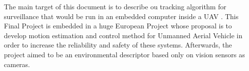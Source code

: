 

The main target of this document is to describe ou tracking algorithm for surveillance that would be run in an embedded computer inside a UAV \cite{Image_processing_UAV}.  This Final Project is embedded in a huge European Project whose proposal is to develop motion estimation and control method for Unmanned Aerial Vehicle in order to increase the reliability and safety of these systems. Afterwards, the project aimed to be an environmental descriptor based only on vision sensors as cameras. \\


 
